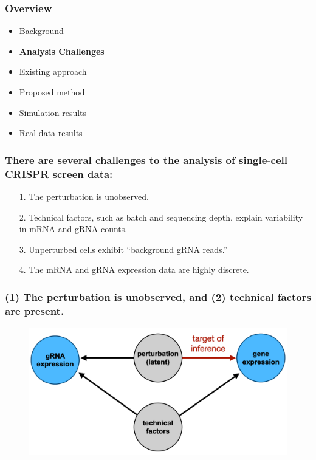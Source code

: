 \documentclass{beamer}
\begin{document}
\begin{frame}
\frametitle{Overview}
\begin{itemize}
	\item Background
	\item\textbf{Analysis Challenges}
	\item Existing approach
	\item Proposed method
	\item Simulation results
	\item Real data results
\end{itemize}
\end{frame}

\begin{frame}
\frametitle{There are several challenges to the analysis of single-cell CRISPR screen data:}

\begin{itemize}
\item[1.] The perturbation is unobserved.
\item[2.] Technical factors, such as batch and sequencing depth, explain variability in mRNA and gRNA counts.
\item[3.] Unperturbed cells exhibit ``background gRNA reads.'' \cite{Schraivogel2020}
\item[4.] The mRNA and gRNA expression data are highly discrete.
\end{itemize}
\end{frame}

\begin{frame}
\frametitle{(1) The perturbation is unobserved, and (2) technical factors are present.}
\begin{figure}
	\centering
	\includegraphics[width=1\linewidth]{../figures/fig1/dag}
	\label{dag}
\end{figure}
\end{frame}
\end{document}
